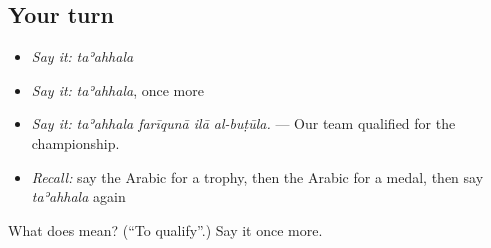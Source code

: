 \subsection*{Your turn}
\begin{itemize}
\raggedright
  \item \emph{Say it:} \emph{taʾahhala}
  \item \emph{Say it:} \emph{taʾahhala}, once more
  \item \emph{Say it:} \emph{taʾahhala farīqunā ilā al-buṭūla.} — Our team qualified for the championship.
  \item \emph{Recall:} say the Arabic for a trophy, then the Arabic for a medal, then say \emph{taʾahhala} again
\end{itemize}

\begin{tcolorbox}[breakable,colback=teal!4,colframe=teal!35!black,title={Before you move on}]
What does  mean? (\textquotedblleft{}To qualify\textquotedblright{}.) Say it once more.
\end{tcolorbox}
